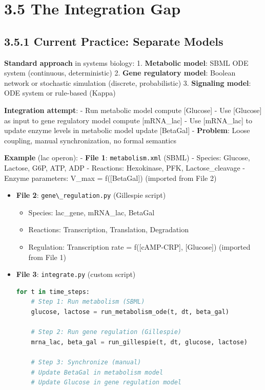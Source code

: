 \hypertarget{the-integration-gap}{%
\section{3.5 The Integration Gap}\label{the-integration-gap}}

\hypertarget{current-practice-separate-models}{%
\subsection{3.5.1 Current Practice: Separate
Models}\label{current-practice-separate-models}}

\textbf{Standard approach} in systems biology: 1. \textbf{Metabolic
model}: SBML ODE system (continuous, deterministic) 2. \textbf{Gene
regulatory model}: Boolean network or stochastic simulation (discrete,
probabilistic) 3. \textbf{Signaling model}: ODE system or rule-based
(Kappa)

\textbf{Integration attempt}: - Run metabolic model \textrightarrow compute
{[}Glucose{]} - Use {[}Glucose{]} as input to gene regulatory model \textrightarrow
compute {[}mRNA\_lac{]} - Use {[}mRNA\_lac{]} to update enzyme levels in
metabolic model \textrightarrow update {[}BetaGal{]} - \textbf{Problem}: Loose
coupling, manual synchronization, no formal semantics

\textbf{Example} (lac operon): - \textbf{File 1}:
\passthrough{\lstinline!metabolism.xml!} (SBML) - Species: Glucose,
Lactose, G6P, ATP, ADP - Reactions: Hexokinase, PFK, Lactose\_cleavage -
Enzyme parameters: V\_max = f({[}BetaGal{]}) (imported from File 2)

\begin{itemize}
\item
  \textbf{File 2}: \passthrough{\lstinline!gene\_regulation.py!}
  (Gillespie script)

  \begin{itemize}
  \tightlist
  \item
    Species: lac\_gene, mRNA\_lac, BetaGal
  \item
    Reactions: Transcription, Translation, Degradation
  \item
    Regulation: Transcription rate = f({[}cAMP-CRP{]}, {[}Glucose{]})
    (imported from File 1)
  \end{itemize}
\item
  \textbf{File 3}: \passthrough{\lstinline!integrate.py!} (custom
  script)

\begin{lstlisting}[language=Python]
for t in time_steps:
    # Step 1: Run metabolism (SBML)
    glucose, lactose = run_metabolism_ode(t, dt, beta_gal)

    # Step 2: Run gene regulation (Gillespie)
    mrna_lac, beta_gal = run_gillespie(t, dt, glucose, lactose)

    # Step 3: Synchronize (manual)
    # Update BetaGal in metabolism model
    # Update Glucose in gene regulation model
\end{lstlisting}
\end{itemize}

